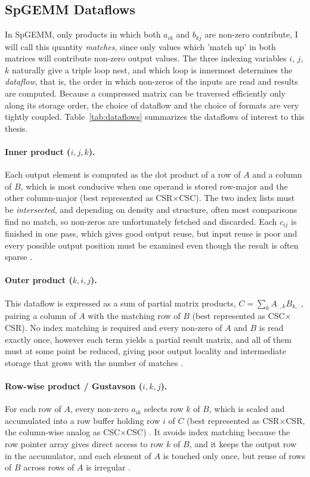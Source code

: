 \subsection{SpGEMM Dataflows}
In SpGEMM, only products in which both
$a_{ik}$ and $b_{kj}$ are non-zero contribute, I will call this quantity \emph{matches}, since only values which 'match up' in both matrices will
contribute non-zero output values. The three indexing variables $i$, $j$, $k$ naturally give a triple loop nest, and
which loop is innermost determines the \emph{dataflow}, that is, the order in which
non-zeros of the inputs are read and results are computed.
Because a compressed matrix can be traversed efficiently only along its
storage order, the choice of dataflow and the choice of formats are very tightly
coupled. Table~\ref{tab:dataflows} summarizes the dataflows of interest to this thesis.

\paragraph{Inner product ($i,j,k$).}
Each output element is computed as the dot product of a row of $A$ and a column
of $B$, which is most conducive when one operand is stored row-major and the other
column-major (best represented as CSR$\times$CSC). The two index lists must be \emph{intersected},
and depending on density and structure, often most comparisons find no match, so non-zeros are unfortunately fetched and discarded.
Each $c_{ij}$ is finished in one pass, which gives good output reuse, but input reuse
is poor and every possible output position must be examined even though the
result is often sparse \cite{srivastava2020matraptor,zhang2020sparch}.

\paragraph{Outer product ($k,i,j$).}
This dataflow is expressed as a sum of partial matrix products, $C = \sum_k A_{:,k}B_{k,:}$,
pairing a column of $A$ with the matching row of $B$ (best represented as CSC$\times$CSR). No index
matching is required and every non-zero of $A$ and $B$ is read exactly once,
however each term yields a partial result matrix, and all of them must at some point be
reduced, giving poor output locality and intermediate storage that grows with the
number of matches \cite{pal2018outerspace,zhang2020sparch,bulucgilbert2008hypersparse,bulucgilbert2010highly}.

\paragraph{Row-wise product / Gustavson ($i,k,j$).}
For each row of $A$, every non-zero $a_{ik}$ selects row $k$ of $B$, which is
scaled and accumulated into a row buffer holding row $i$ of $C$ (best represented as CSR$\times$CSR,
the column-wise analog as CSC$\times$CSC) \cite{gustavson1978}. It avoids index matching because the row pointer array
gives direct access to row $k$ of $B$, and it keeps the output row in the
accumulator, and each element of $A$ is touched only once, but reuse of rows of $B$ across rows of $A$ is irregular
\cite{zhang2021gamma}.

